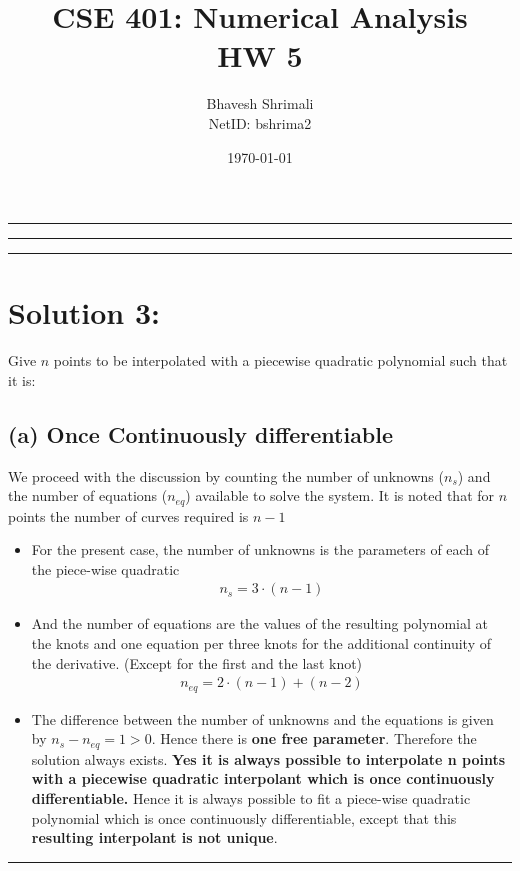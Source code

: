
\title{\bf CSE 401: Numerical Analysis \\ HW 5}
\author{Bhavesh Shrimali \\ NetID: bshrima2}
\date{\today}
\titlespacing*{\title}{-2ex}{*-2ex}{-2ex}

\maketitle \hrule \hrule \hrule
\section*{Solution 3:}
Give $n$ points to be interpolated with a piecewise quadratic polynomial such that it is: 
\subsection*{(a) Once Continuously differentiable}
We proceed with the discussion by counting the number of unknowns ($n_s$) and the number of equations ($n_{eq}$) available to solve the system. It is noted that for $n$ points the number of curves required is $n-1$
\begin{itemize}
\item For the present case, the number of unknowns is the parameters of each of the piece-wise quadratic
\begin{align*}
n_s = 3\cdot(n-1)
\end{align*}
\item And the number of equations are the values of the resulting polynomial at the knots and one equation per three knots for the additional continuity of the derivative. (Except for the first and the last knot)
\begin{align*}
n_{eq} = 2\cdot(n-1) + (n-2)
\end{align*}
\item The difference between the number of unknowns and the equations is given by $n_s - n_{eq} = 1 > 0$. Hence there is { \bf one free parameter}. Therefore the solution always exists. {\bf Yes it is always possible to interpolate n points with a piecewise quadratic interpolant which is once continuously differentiable. } Hence it is always possible to fit a piece-wise quadratic polynomial which is once continuously differentiable, except that this { \bf resulting interpolant is not unique}. 
\end{itemize} \hrule
 
